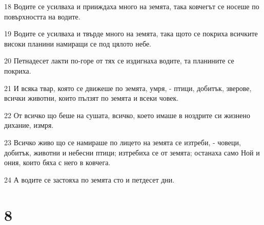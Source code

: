 \par 18 Водите се усилваха и прииждаха много на земята, така ковчегът се носеше по повърхността на водите.
\par 19 Водите се усилваха и твърде много на земята, така щото се покриха всичките високи планини намиращи се под цялото небе.
\par 20 Петнадесет лакти по-горе от тях се издигнаха водите, та планините се покриха.
\par 21 И всяка твар, която се движеше по земята, умря, - птици, добитък, зверове, всички животни, които пълзят по земята и всеки човек.
\par 22 От всичко що беше на сушата, всичко, което имаше в ноздрите си жизнено дихание, измря.
\par 23 Всичко живо що се намираше по лицето на земята се изтреби, - човеци, добитък, животни и небесни птици; изтребиха се от земята; останаха само Ной и ония, които бяха с него в ковчега.
\par 24 А водите се застояха по земята сто и петдесет дни.

\chapter{8}

